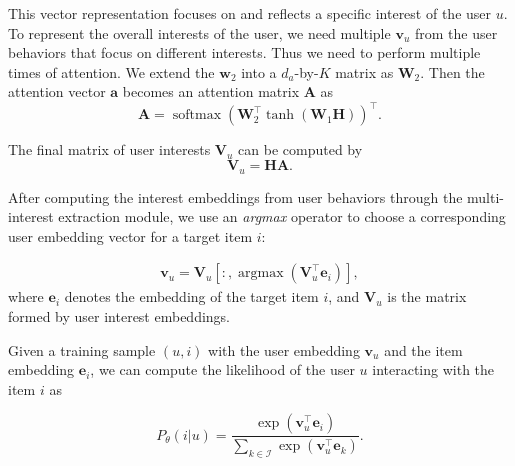 This vector representation focuses on and reflects a specific interest of the user $u$. To represent the overall interests of the user, we need multiple $\mathbf{v}_u$ from the user behaviors that focus on different interests. Thus we need to perform multiple times of attention. We extend the $\mathbf{w}_{2}$ into a $d_a$-by-$K$ matrix as $\mathbf{W}_{2}$. Then the attention vector $\mathbf{a}$ becomes an attention matrix $\mathbf{A}$ as
\begin{equation}
    \mathbf{A} = \operatorname{softmax}(\mathbf{W}_{2}^\top \operatorname{tanh}(\mathbf{W}_{1} \mathbf{H}))^\top.
\end{equation}

The final matrix of user interests $\mathbf{V}_u$ can be computed by
\begin{equation}
    \label{eqn:sa}
    \mathbf{V}_u = \mathbf{H} \mathbf{A}.
\end{equation}



After computing the interest embeddings from user behaviors through the multi-interest extraction module, we use an \textit{argmax} operator to choose a corresponding user embedding vector for a target item $i$:

\begin{equation}
    \label{eqn:argmax}
    \begin{aligned}
        \mathbf{v}_u = \mathbf{V}_u[:, \operatorname{argmax}(\mathbf{V}_u^\top \mathbf{e}_i)],
    \end{aligned}
\end{equation}
where $\mathbf{e}_i$ denotes the embedding of the target item $i$, and $\mathbf{V}_u$ is the matrix formed by user interest embeddings. %

Given a training sample $(u,i)$ with the user embedding $\mathbf{v}_u$ and the item embedding $\mathbf{e}_i$, we can compute the likelihood of the user $u$ interacting with the item $i$ as

\begin{equation}
    \label{eqn:likelihood}
    P_\theta(i|u) = \frac{\exp(\mathbf{v}_u^\top \mathbf{e}_i)}{\sum_{k\in\mathcal{I}}\exp(\mathbf{v}_u^\top \mathbf{e}_k)}.
\end{equation}

